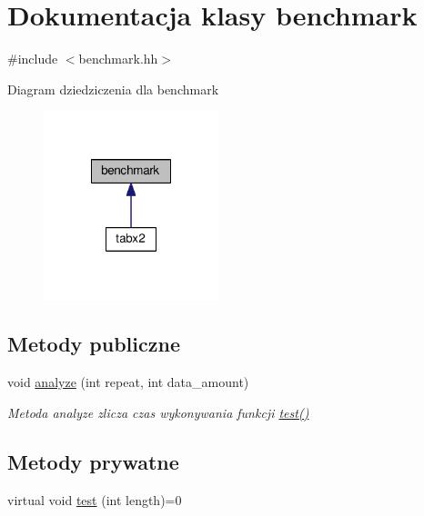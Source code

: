 \hypertarget{classbenchmark}{\section{Dokumentacja klasy benchmark}
\label{classbenchmark}
}


{\ttfamily \#include $<$benchmark.\-hh$>$}



Diagram dziedziczenia dla benchmark\nopagebreak
\begin{figure}[H]
\begin{center}
\leavevmode
\includegraphics[width=144pt]{classbenchmark__inherit__graph}
\end{center}
\end{figure}
\subsection*{Metody publiczne}
\begin{DoxyCompactItemize}
\item 
void \hyperlink{classbenchmark_a23e508cd746c10ba8a650965673aa839}{analyze} (int repeat, int data\-\_\-amount)
\begin{DoxyCompactList}\small\item\em Metoda analyze zlicza czas wykonywania funkcji \hyperlink{classbenchmark_a698d333f815e6e12c0817b1dfee56e99}{test()} \end{DoxyCompactList}\end{DoxyCompactItemize}
\subsection*{Metody prywatne}
\begin{DoxyCompactItemize}
\item 
virtual void \hyperlink{classbenchmark_a698d333f815e6e12c0817b1dfee56e99}{test} (int length)=0
\end{DoxyCompactItemize}


